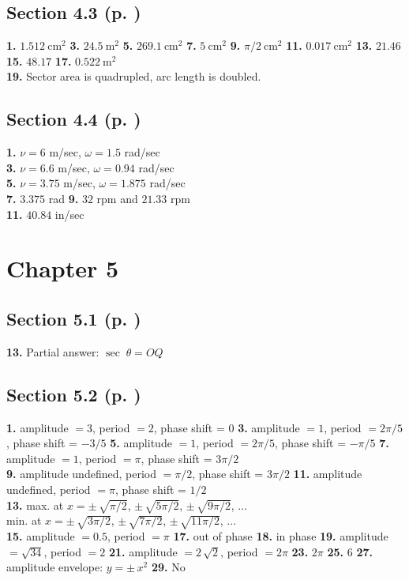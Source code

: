 \begin{multicols}{2}
\subsection*{Section 4.3 (p. \pageref{sec4dot3})}
\textbf{1.} $1.512~\text{cm}^2$ \quad \textbf{3.} $24.5~\text{m}^2$ \quad
\textbf{5.} $269.1~\text{cm}^2$ \quad \textbf{7.} $5~\text{cm}^2$ \quad
\textbf{9.} $\pi/2~\text{cm}^2$ \quad \textbf{11.} $0.017~\text{cm}^2$ \quad
\textbf{13.} $21.46$ \quad \textbf{15.} $48.17$ \quad \textbf{17.} $0.522~\text{m}^2$\\
\textbf{19.} Sector area is quadrupled, arc length is doubled.
\subsection*{Section 4.4 (p. \pageref{sec4dot4})}
\textbf{1.} $\nu=6$ m/sec, $\omega=1.5$ rad/sec\\
\textbf{3.} $\nu=6.6$ m/sec, $\omega=0.94$ rad/sec\\
\textbf{5.} $\nu=3.75$ m/sec, $\omega=1.875$ rad/sec\\
\textbf{7.} $3.375$ rad \quad \textbf{9.} $32$ rpm and $21.33$ rpm\\
\textbf{11.} $40.84$ in/sec
\section*{Chapter 5}
\subsection*{Section 5.1 (p. \pageref{sec5dot1})}
\textbf{13.} Partial answer: $\sec\;\theta = OQ$
\subsection*{Section 5.2 (p. \pageref{sec5dot2})}
\textbf{1.} amplitude $= 3$, period $= 2$, phase shift = $0$ \quad
\textbf{3.} amplitude $= 1$, period $= 2\pi/5$, phase shift = $-3/5$ \quad
\textbf{5.} amplitude $= 1$, period $= 2\pi/5$, phase shift = $-\pi/5$ \quad
\textbf{7.} amplitude $= 1$, period $= \pi$, phase shift = $3\pi/2$\\
\textbf{9.} amplitude undefined, period $= \pi/2$, phase shift = $3\pi/2$ \quad
\textbf{11.} amplitude undefined, period $= \pi$, phase shift = $1/2$\\
\textbf{13.} max. at $x=\pm\,\sqrt{\pi/2}$, $\pm\,\sqrt{5\pi/2}$, $\pm\,\sqrt{9\pi/2}$, $...$\\
min. at $x=\pm\,\sqrt{3\pi/2}$, $\pm\,\sqrt{7\pi/2}$, $\pm\,\sqrt{11\pi/2}$, $...$\\
\textbf{15.} amplitude $= 0.5$, period $= \pi$ \quad \textbf{17.} out of phase \quad
\textbf{18.} in phase \quad \textbf{19.} amplitude $= \sqrt{34}$, period $= 2$ \quad
\textbf{21.} amplitude $= 2\,\sqrt{2}$, period $= 2\pi$ \quad
\textbf{23.} $2\pi$ \quad \textbf{25.} $6$ \quad \textbf{27.} amplitude envelope: $y=\pm\,x^2$ \quad
\textbf{29.} No

\end{multicols}
